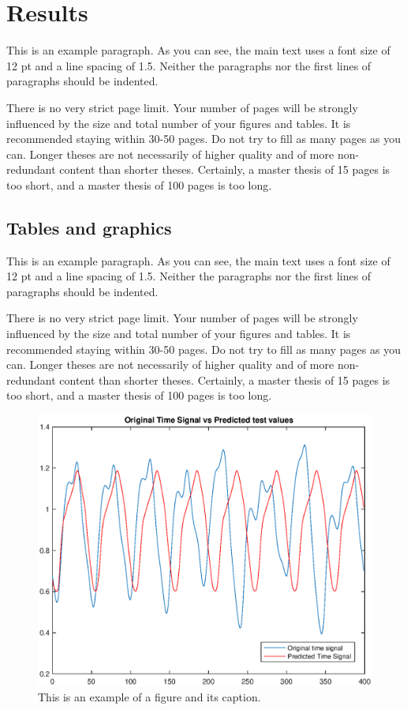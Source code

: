 
\chapter{Results}

This is an example paragraph. As you can see, the main text uses a font size of 12 pt and a line spacing of 1.5. Neither the paragraphs nor the first lines of paragraphs should be indented.

There is no very strict page limit. Your number of pages will be strongly influenced by the size and total number of your figures and tables. It is recommended staying within 30-50 pages. Do not try to fill as many pages as you can. Longer theses are not necessarily of higher quality and of more non-redundant content than shorter theses. Certainly, a master thesis of 15 pages is too short, and a master thesis of 100 pages is too long.

\section{Tables and graphics}

This is an example paragraph. As you can see, the main text uses a font size of 12 pt and a line spacing of 1.5. Neither the paragraphs nor the first lines of paragraphs should be indented.

There is no very strict page limit. Your number of pages will be strongly influenced by the size and total number of your figures and tables. It is recommended staying within 30-50 pages. Do not try to fill as many pages as you can. Longer theses are not necessarily of higher quality and of more non-redundant content than shorter theses. Certainly, a master thesis of 15 pages is too short, and a master thesis of 100 pages is too long.

\begin{figure}[!ht]
\includegraphics[clip,width=\columnwidth]{Figures/PlotTimeSeriesResult}%
\caption{This is an example of a figure and its caption.}
\label{fig:timeseries}
\end{figure}

